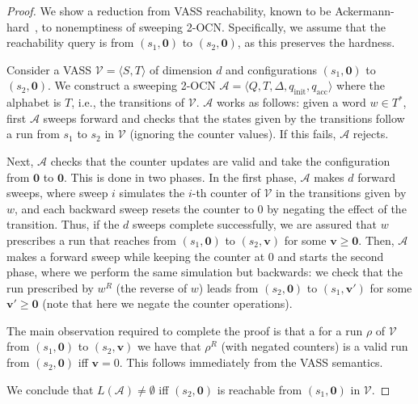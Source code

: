 \documentclass[11pt,a4paper]{amsart}
\theoremstyle{definition}
\newcommand{\shtodo}[1]{\todo[color=cyan!25,size=\small]{SH: #1}}
\newcommand{\tup}[1]{\langle #1 \rangle}
\newcommand{\initstate}{q_{\mathrm{init}}}
\newcommand{\accstate}{q_{\mathrm{acc}}}
\renewcommand{\vec}[1]{\boldsymbol{#1}}
\newcommand{\cA}{\mathcal{A}}
\newcommand{\cV}{\mathcal{V}}
\begin{document}
\begin{proof}
	We show a reduction from VASS reachability, known to be
	Ackermann-hard~\cite{leroux2022reachability,czerwinski2022reachability}, to
	nonemptiness of sweeping 2-OCN. Specifically, we assume that the
	reachability query is from $(s_1,\vec{0})$ to $(s_2,\vec{0})$, as this
	preserves the hardness.
	
	Consider a VASS $\cV=\tup{S,T}$ of dimension $d$ and configurations
	$(s_1,\vec{0})$ to $(s_2,\vec{0})$.  We construct a sweeping 2-OCN
	$\cA=\tup{Q,T,\Delta,\initstate,\accstate}$ where the alphabet is $T$, i.e., the
	transitions of $\cV$. $\cA$ works as follows: given a word $w\in T^*$, first
	$\cA$ sweeps forward and checks that the states given by the transitions
	follow a run from $s_1$ to $s_2$ in $\cV$ (ignoring the counter values). If
	this fails, $\cA$ rejects.
	
	Next, $\cA$ checks that the counter updates are valid and take the
	configuration from $\vec{0}$ to $\vec{0}$. This is done in two phases. In
	the first phase, $\cA$ makes $d$ forward sweeps, where sweep $i$ simulates
	the $i$-th counter of $\cV$ in the transitions given by $w$, and each
	backward sweep resets the counter to $0$ by negating the effect of the
	transition.  Thus, if the $d$ sweeps complete successfully, we are assured
	that $w$ prescribes a run that reaches from $(s_1,\vec{0})$ to
	$(s_2,\vec{v})$ for some $\vec{v}\ge \vec{0}$.  Then, $\cA$ makes a forward
	sweep while keeping the counter at $0$ and starts the second phase, where we
	perform the same simulation but backwards: we check that the run prescribed
	by $w^R$ (the reverse of $w$) leads from $(s_2,\vec{0})$ to $(s_1,\vec{v'})$
	for some $\vec{v'}\ge\vec{0}$ (note that here we negate the counter
	operations).
	
	The main observation required to complete the proof is that a for a run $\rho$
	of $\cV$ from $(s_1,\vec{0})$ to $(s_2,\vec{v})$ we have that $\rho^R$ (with
	negated counters) is a valid run from $(s_2,\vec{0})$ iff $\vec{v}=0$. This
	follows immediately from the VASS semantics.
	
	We conclude that $L(\cA)\neq \emptyset$ iff $(s_2,\vec{0})$ is reachable from
	$(s_1,\vec{0})$ in $\cV$.
\end{proof}
\end{document}
